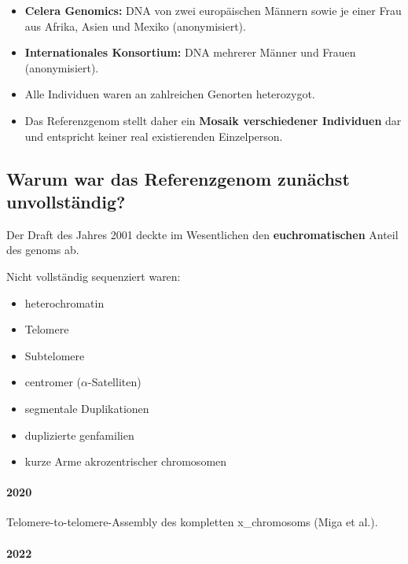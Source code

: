 \begin{itemize}
    \item \textbf{Celera Genomics:}
    DNA von zwei europäischen Männern sowie je einer Frau aus Afrika,
    Asien und Mexiko (anonymisiert).

    \item \textbf{Internationales Konsortium:}
    DNA mehrerer Männer und Frauen (anonymisiert).

    \item Alle Individuen waren an zahlreichen Genorten heterozygot.

    \item Das Referenzgenom stellt daher ein
    \textbf{Mosaik verschiedener Individuen}
    dar und entspricht keiner real existierenden Einzelperson.
\end{itemize}

\subsection*{Warum war das Referenzgenom zunächst unvollständig?}\label{subsec:warum-war-das-referenzgenom-zunachst-unvollstandig?}

Der Draft des Jahres 2001 deckte im Wesentlichen den
\textbf{euchromatischen} Anteil des \gls{genom}s ab.

Nicht vollständig sequenziert waren:

\begin{itemize}
    \item \gls{heterochromatin}
    \item Telomere
    \item Subtelomere
    \item \gls{centromer} ($\alpha$-Satelliten)
    \item segmentale Duplikationen
    \item duplizierte \gls{genfamilie}n
    \item kurze Arme akrozentrischer \gls{chromosom}en
\end{itemize}

\paragraph{2020}

Telomere-to-telomere-Assembly des kompletten
\gls{x_chromosom}s (Miga et al.).

\paragraph{2022}

